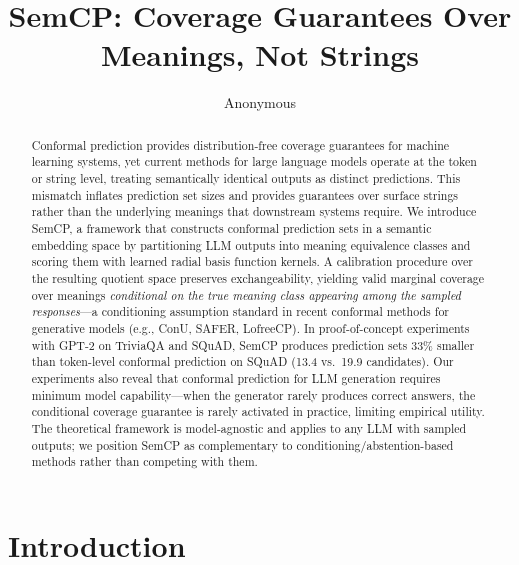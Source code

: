 \documentclass{article}
\title{SemCP: Coverage Guarantees Over Meanings, Not Strings}
\author{Anonymous}
\begin{document}
\begin{abstract}
Conformal prediction provides distribution-free coverage guarantees for machine learning systems, yet current methods for large language models operate at the token or string level, treating semantically identical outputs as distinct predictions. This mismatch inflates prediction set sizes and provides guarantees over surface strings rather than the underlying meanings that downstream systems require. We introduce SemCP, a framework that constructs conformal prediction sets in a semantic embedding space by partitioning LLM outputs into meaning equivalence classes and scoring them with learned radial basis function kernels. A calibration procedure over the resulting quotient space preserves exchangeability, yielding valid marginal coverage over meanings \emph{conditional on the true meaning class appearing among the sampled responses}---a conditioning assumption standard in recent conformal methods for generative models (e.g., ConU, SAFER, LofreeCP). In proof-of-concept experiments with GPT-2 on TriviaQA and SQuAD, SemCP produces prediction sets 33\% smaller than token-level conformal prediction on SQuAD (13.4 vs.\ 19.9 candidates). Our experiments also reveal that conformal prediction for LLM generation requires minimum model capability---when the generator rarely produces correct answers, the conditional coverage guarantee is rarely activated in practice, limiting empirical utility. The theoretical framework is model-agnostic and applies to any LLM with sampled outputs; we position SemCP as complementary to conditioning/abstention-based methods rather than competing with them.
\end{abstract}

\maketitle

\section{Introduction}

\label{sec:introduction}
\end{document}
